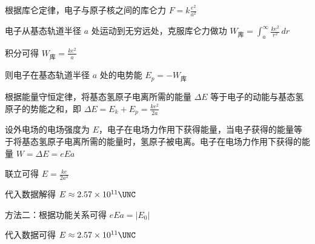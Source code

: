 \documentclass[\gkver]{gaokaozhenti}
\begin{document}
\begin{enumerate}
{根据库仑定律，电子与原子核之间的库仑力 $F = k\frac{e^{2}}{a^{2}}$

电子从基态轨道半径 $a$ 处运动到无穷远处，克服库仑力做功 $W_{\text{库}} = \int_{a}^{\infty} \frac{ke^{2}}{r^{2}} \, dr$

积分可得 $W_{\text{库}} = \frac{ke^{2}}{a}$

则电子在基态轨道半径 $a$ 处的电势能 $E_{p} = -W_{\text{库}}$

根据能量守恒定律，将基态氢原子电离所需的能量 $\Delta E$ 等于电子的动能与基态氢原子的势能之和，即 $\Delta E = E_{k} + E_{p} = \frac{ke^{2}}{2a}$

设外电场的电场强度为 $E$，电子在电场力作用下获得能量，当电子获得的能量等于将基态氢原子电离所需的能量时，氢原子被电离。电子在电场力作用下获得的能量 $W = \Delta E = eEa$

联立可得 $E = \frac{ke}{2a^{2}}$

代入数据解得 $E \approx 2.57 \times 10^{11} \UNC$

方法二：根据功能关系可得 $eEa = |E_{0}|$

代入数据可得 $E \approx 2.57 \times 10^{11} \UNC$
}

\end{enumerate}
\end{document}
